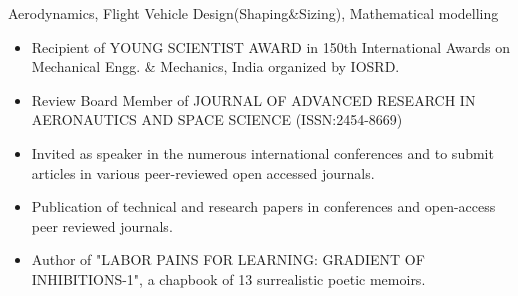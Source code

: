 \documentclass[a4paper]{article}
\begin{document}
\colorbox{mygrey}{\hspace{\linewidth}\hspace{-2\fboxsep}}	
\begin{flushleft}
 Aerodynamics, Flight Vehicle Design(Shaping\&Sizing), Mathematical modelling
\end{flushleft}
\colorbox{mygrey}{\hspace{\linewidth}\hspace{-2\fboxsep}}
\begin{itemize}
\item Recipient of YOUNG SCIENTIST AWARD in 150th International Awards on Mechanical
Engg. \& Mechanics, India organized by IOSRD.
\item Review Board Member of JOURNAL OF ADVANCED RESEARCH IN AERONAUTICS AND SPACE SCIENCE (ISSN:2454-8669)
\item Invited as speaker in the numerous international conferences and to submit articles in various peer-reviewed open accessed journals.
\item Publication of technical and research papers in conferences and open-access peer reviewed journals.
\item Author of "LABOR PAINS FOR LEARNING: GRADIENT OF INHIBITIONS-1", a chapbook of 13 surrealistic poetic memoirs.
\end{itemize}
\colorbox{mygrey}{\hspace{\linewidth}\hspace{-2\fboxsep}}
\end{document}
